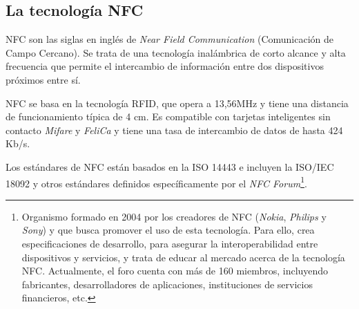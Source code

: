 


  \subsection{La tecnología \acs{NFC}}
\acs{NFC} son las siglas en inglés de \emph{Near Field Communication}
(Comunicación de Campo Cercano). Se trata de una tecnología inalámbrica de
corto alcance y alta frecuencia que permite el intercambio de información
entre dos dispositivos próximos entre sí.

\acs{NFC} se basa en la tecnología \acs{RFID}, que opera a 13,56MHz y tiene
una distancia de funcionamiento típica de 4 cm. Es compatible con tarjetas
inteligentes sin contacto \emph{Mifare} y \emph{FeliCa} y tiene una tasa de
intercambio de datos de hasta 424 Kb/s.

Los estándares de \acs{NFC} están basados en la \acs{ISO} 14443 e incluyen
la \acs{ISO}/\acs{IEC} 18092 y otros estándares definidos específicamente por
el \emph{NFC Forum}\footnote{Organismo formado en 2004 por los creadores de
\acs{NFC} (\emph{Nokia}, \emph{Philips} y \emph{Sony}) y que busca promover
el uso de esta tecnología. Para ello, crea especificaciones de desarrollo,
para asegurar la interoperabilidad entre dispositivos y servicios, y trata
de educar al mercado acerca de la tecnología \acs{NFC}. Actualmente, el foro
cuenta con más de 160 miembros, incluyendo fabricantes, desarrolladores de
aplicaciones, instituciones de servicios financieros, etc.\cite{bib:nfcForum}}.

